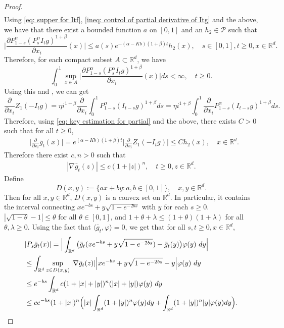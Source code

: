 \documentclass[12pt,a4paper]{amsart}
\theoremstyle{plain}
\theoremstyle{definition}
\numberwithin{equation}{section}
\begin{document}
\begin{proof}
\begin{align}
\end{align}
    Using \eqref{eq: supper for Itf}, \eqref{ineq: control of partial derivative of Itg} and the above, we have that there exist a bounded function $a$ on $[0,1]$ and an $h_2 \in \mathcal P$ such that
\begin{equation}
\label{eq: key estimation for partial}
    \Big|\frac{\partial P_{1-s}^\alpha  (P_s^\alpha I_t g)^{1+\beta}}{\partial x_i}  (x)\Big| \leq a(s) e^{-(\alpha - Kb)(1+\beta)t}h_2(x),\quad s\in [0,1],t\geq 0, x\in \mathbb R^d.
\end{equation}
    Therefore, for each compact subset $A \subset \mathbb R^d$, we have
\[
    \int_0^1 \sup_{x\in A} \Big|\frac{\partial P_{1-s}^\alpha  (P_s^\alpha I_t g)^{1+\beta}}{\partial x_i}  (x)\Big| ds < \infty,\quad t\geq 0.
\]
Using this and \cite[Theorem A.5.2]{Durrett2010Probability}, we can get
\[
    \frac{\partial}{\partial x_i} Z_1(-I_tg)
    = \eta i^{1+\beta}  \frac{\partial}{\partial x_i} \int_0^1 P_{1-s}^\alpha (I_{t-s}g)^{1+\beta} ds
    = \eta i^{1+\beta}  \int_0^1  \frac{\partial}{\partial x_i} P_{1-s}^\alpha (I_{t-s}g)^{1+\beta} ds.
\]
    Therefore, using \eqref{eq: key estimation for partial} and the above, there exists  $C> 0$ such that for all $t\geq 0$,
\begin{align}
    &\Big|\frac{\partial}{\partial x_i}\bar{g}_t(x)\Big|
    = e^{(\alpha-Kb)(1+\beta)t}\Big|\frac{\partial}{\partial x_i}Z_1(-I_tg)\Big| \leq C h_2(x),
    \quad x\in \mathbb R^d.
\end{align}
Therefore there exist $c,n>0$ such that
\begin{align}\label{ineq: control of sup gt}
    |\nabla \bar g_t (z)|
    \leq c(1+|z|)^n,
    \quad t\geq 0, z\in \mathbb R^d.
\end{align}
    Define
\[
    D(x,y):= \{ax+by: a,b\in [0,1]\},\quad x, y \in \mathbb R^d.
\]
    Then for all $x,y\in \mathbb R^d$, $D(x,y)$ is a convex set on $\mathbb R^d$.
    In particular, it contains the interval connecting $xe^{-bs}+y\sqrt{1-e^{-2bs}}$ with $y$ for each $s\geq 0$.
$|\sqrt {1-\theta} - 1| \leq \theta$ for all $\theta\in [0,1]$,
and
$1+\theta + \lambda \leq (1+\theta)(1+\lambda)$ for all $\theta ,\lambda \geq 0$.
	Using the fact that $\langle \bar{g}_t,\varphi\rangle = 0$, 
    we get that for all $s,t\geq 0, x\in \mathbb R^d$,
\begin{align}
    &|P_s\bar{g}_t(x)|
    = \Big|\int_{\mathbb R^d} \big(\bar {g}_t(xe^{-bs}+y\sqrt{1-e^{-2bs}})-\bar {g}_t (y)\big) \varphi(y)~dy \Big| \\
    & \leq \int_{\mathbb R^d} \sup_{z\in D(x,y)} |\nabla \bar g_t (z)|\Big|xe^{-bs}+y\sqrt{1-e^{-2bs}}-y \Big| \varphi(y)~dy \\
    & \leq e^{-bs}\int_{\mathbb R^d} c(1+|x|+|y|)^n (|x|+|y|) \varphi(y)~dy
    \\& \leq ce^{-bs}(1+|x|)^n\Big(|x|\int_{\mathbb R^d} (1+|y|)^n\varphi(y)dy + \int_{\mathbb R^d}(1+|y|)^n|y|\varphi(y)dy\Big).
    \qedhere
\end{align}
\end{proof}
\end{document}
